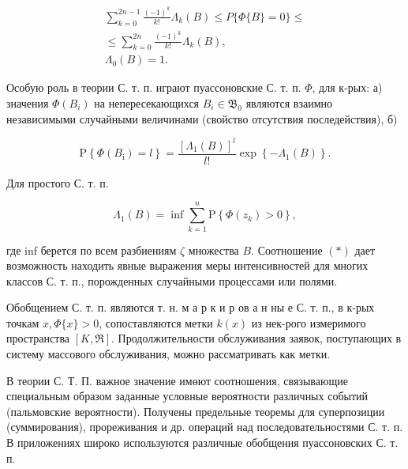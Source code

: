 \documentclass[10pt]{article}
\begin{document}
\[

\begin{gathered}

\sum_{k=0}^{2 n-1} \frac{(-1)^{k}}{k !} \Lambda_{k}(B) \leqslant P\{\Phi\{B\}=0\} \leqslant \\

\leqslant \sum_{k=0}^{2 n} \frac{(-1)^{k}}{k !} \Lambda_{k}(B), \\

\Lambda_{0}(B)=1 .

\end{gathered}

\]



Особую роль в теории С. т. п. играют пуассоновские С. т. п. $\Phi$, для к-рых: а) значения $\Phi\left(B_{i}\right)$ на непересекающихся $B_{i} \in \mathfrak{B}_{0}$ являются взаимно независимыми случайными величинами (свойство отсутствия последействия), б)



\[

\mathrm{P}\left\{\Phi\left(B_{\mathrm{i}}\right)=l\right\}=\frac{\left[\Lambda_{1}(B)\right]^{l}}{l !} \exp \left\{-\Lambda_{1}(B)\right\} .

\]



Для простого С. т. п.



\[

\Lambda_{1}(B)=\inf \sum_{k=1}^{n} \mathrm{P}\left\{\Phi\left(z_{k}\right)>0\right\},

\]



где inf берется по всем разбиениям $\zeta$ множества $B$. Соотношение $(*)$ дает возможность находить явные выражения меры интенсивностей для многих классов С. т. п., порожденных случайными процессами или полями.



Обобщением С. т. п. являются т. н. м а р к и р ов а н ны е С. т. п., в к-рых точкам $x, \Phi\{x\}>0$, сопоставляются метки $k(x)$ из нек-рого измеримого пространства $[K, \Re]$. Продолжительности обслуживания заявок, поступающих в систему массового обслуживания, можно рассматривать как метки.



В теории С. Т. П. важное значение имөют соотношения, связывающие специальным образом заданные условные вероятности различных событий (пальмовские вероятности). Получены предельные теоремы для суперпозиции (суммирования), прореживания и др. операций над последовательностями С. т. п. В приложениях широко используются различные обобщения пуассоновских С. т. п.
\end{document}
